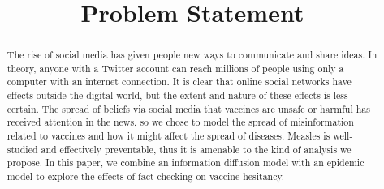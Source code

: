 \documentclass[conference]{IEEEtran}
\begin{document}
%
\title{Problem Statement}


\author{
}

\maketitle

\begin{abstract}
The rise of social media has given people new ways to communicate and share ideas. In theory, anyone with a Twitter account can reach millions of people using only a computer with an internet connection. It is clear that online social networks have effects outside the digital world, but the extent and nature of these effects is less certain. The spread of beliefs via social media that vaccines are unsafe or harmful has received attention in the news, so we chose to model the spread of misinformation related to vaccines and how it might affect the spread of diseases. Measles is well-studied and effectively preventable, thus it is amenable to the kind of analysis we propose. In this paper, we combine an information diffusion model with an epidemic model to explore the effects of fact-checking on vaccine hesitancy.
\end{abstract}

\end{document}
